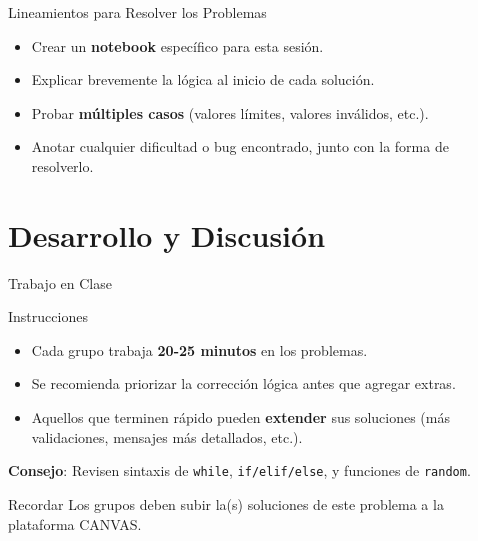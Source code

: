 \documentclass[10pt]{beamer}
\begin{document}
\begin{frame}{Lineamientos para Resolver los Problemas}
  \begin{itemize}
    \item Crear un \textbf{notebook} específico para esta sesión.
    \item Explicar brevemente la lógica al inicio de cada solución.
    \item Probar \textbf{múltiples casos} (valores límites, valores inválidos, etc.).
    \item Anotar cualquier dificultad o bug encontrado, junto con la forma de resolverlo.
  \end{itemize}
\end{frame}

\section{Desarrollo y Discusión}

\begin{frame}{Trabajo en Clase}
  \begin{block}{Instrucciones}
    \begin{itemize}
      \item Cada grupo trabaja \textbf{20-25 minutos} en los problemas.
      \item Se recomienda priorizar la corrección lógica antes que agregar extras.
      \item Aquellos que terminen rápido pueden \textbf{extender} sus soluciones (más validaciones, mensajes más detallados, etc.).
    \end{itemize}
  \end{block}
  \textbf{Consejo}: Revisen sintaxis de \texttt{while}, \texttt{if/elif/else}, y funciones de \texttt{random}.

  \begin{block}{Recordar}
    Los grupos deben subir la(s) soluciones de este problema a la plataforma CANVAS.
  \end{block}
\end{frame}
\end{document}
